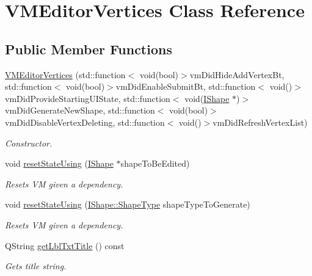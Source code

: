 \hypertarget{class_v_m_editor_vertices}{}\section{V\+M\+Editor\+Vertices Class Reference}
\label{class_v_m_editor_vertices}
\subsection*{Public Member Functions}
\begin{DoxyCompactItemize}
\item 
\mbox{\hyperlink{class_v_m_editor_vertices_ace292193ea7f4a08d79c590a17384c57}{V\+M\+Editor\+Vertices}} (std\+::function$<$ void(bool)$>$vm\+Did\+Hide\+Add\+Vertex\+Bt, std\+::function$<$ void(bool)$>$vm\+Did\+Enable\+Submit\+Bt, std\+::function$<$ void()$>$vm\+Did\+Provide\+Starting\+U\+I\+State, std\+::function$<$ void(\mbox{\hyperlink{class_i_shape}{I\+Shape}} $\ast$)$>$vm\+Did\+Generate\+New\+Shape, std\+::function$<$ void(bool)$>$vm\+Did\+Disable\+Vertex\+Deleting, std\+::function$<$ void()$>$vm\+Did\+Refresh\+Vertex\+List)
\begin{DoxyCompactList}\small\item\em Constructor. \end{DoxyCompactList}\item 
void \mbox{\hyperlink{class_v_m_editor_vertices_ada7b06ed4146f561c1472148a994a871}{reset\+State\+Using}} (\mbox{\hyperlink{class_i_shape}{I\+Shape}} $\ast$shape\+To\+Be\+Edited)
\begin{DoxyCompactList}\small\item\em Resets VM given a dependency. \end{DoxyCompactList}\item 
void \mbox{\hyperlink{class_v_m_editor_vertices_abe3cb316fd9c1751b0163ab137c01148}{reset\+State\+Using}} (\mbox{\hyperlink{class_i_shape_a8f50993477b5ddb44c0547ef3d547cdc}{I\+Shape\+::\+Shape\+Type}} shape\+Type\+To\+Generate)
\begin{DoxyCompactList}\small\item\em Resets VM given a dependency. \end{DoxyCompactList}\item 
Q\+String \mbox{\hyperlink{class_v_m_editor_vertices_acd45db915cce57f22aef0fa5869c78b8}{get\+Lbl\+Txt\+Title}} () const
\begin{DoxyCompactList}\small\item\em Gets title string. \end{DoxyCompactList}\item 

\end{DoxyCompactItemize}
